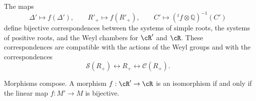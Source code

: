 \begin{proposition}\label{sga3:XXI:6.1.3}
The maps
\[
 \Delta'\longmapsto f(\Delta'),\qquad
 R'_+\longmapsto f(R'_+),\qquad
 C'\longmapsto({}^tf\otimes\mathbb Q)^{-1}(C')
\]
define bijective correspondences between the systems of simple roots,
the systems of positive roots, and the Weyl chambers for \(\cR'\) and
\(\cR\). These correspondences are compatible with the actions of the
Weyl groups and with the correspondences
\[
 \mathscr{S}(R_+)\longleftrightarrow R_+
 \longleftrightarrow\mathscr{C}(R_+).
\]
\end{proposition}

\begin{lemma}\label{sga3:XXI:6.1.4}
Morphisms compose. A morphism \(f:\cR'\to\cR\) is an isomorphism if
and only if the linear map \(f:M'\to M\) is bijective.
\end{lemma}
